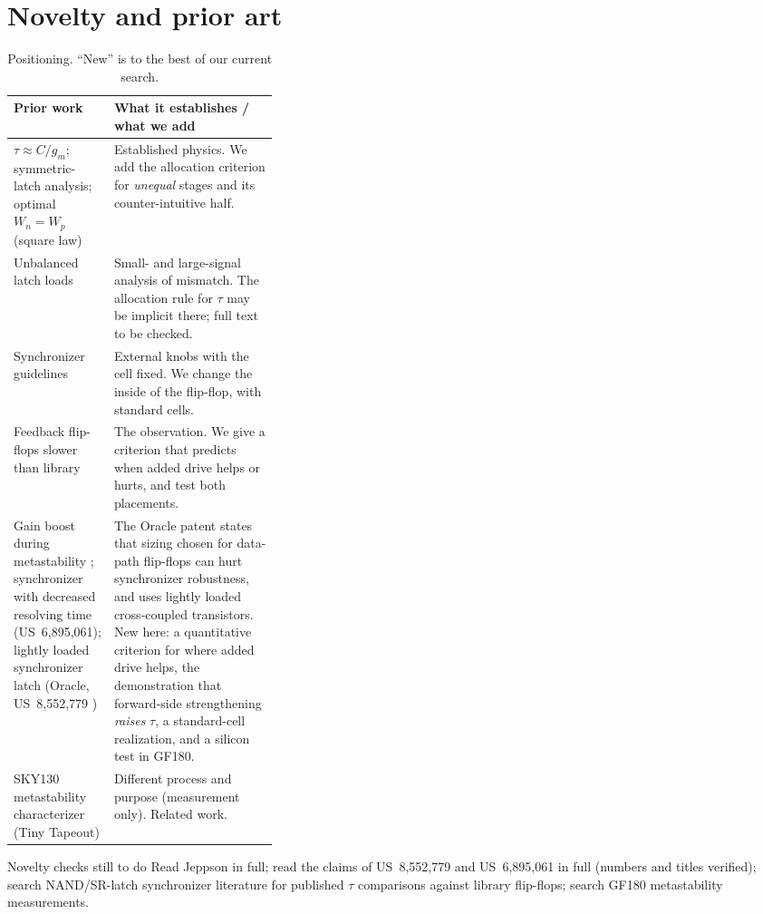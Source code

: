 \documentclass[11pt]{article}
\begin{document}
\section{Novelty and prior art}
\begin{table}[H]
\centering\small
\begin{tabularx}{\linewidth}{@{}p{0.34\linewidth}X@{}}
\toprule
Prior work & What it establishes / what we add \\
\midrule
$\tau\approx C/g_m$; symmetric-latch analysis; optimal $W_n=W_p$ (square law) \cite{portmann1995} & Established physics. We add the allocation criterion for \emph{unequal} stages and its counter-intuitive half. \\
Unbalanced latch loads \cite{jeppson1996} & Small- and large-signal analysis of mismatch. The allocation rule for $\tau$ may be implicit there; full text to be checked. \\
Synchronizer guidelines \cite{beer2015} & External knobs with the cell fixed. We change the inside of the flip-flop, with standard cells. \\
Feedback flip-flops slower than library \cite{beer2011} & The observation. We give a criterion that predicts when added drive helps or hurts, and test both placements. \\
Gain boost during metastability \cite{zhou2006}; synchronizer with decreased resolving time (US~6{,}895{,}061); lightly loaded synchronizer latch (Oracle, US~8{,}552{,}779 \cite{oracle2013}) & The Oracle patent states that sizing chosen for data-path flip-flops can hurt synchronizer robustness, and uses lightly loaded cross-coupled transistors. New here: a quantitative criterion for where added drive helps, the demonstration that forward-side strengthening \emph{raises} $\tau$, a standard-cell realization, and a silicon test in GF180. \\
SKY130 metastability characterizer (Tiny Tapeout) & Different process and purpose (measurement only). Related work. \\
\bottomrule
\end{tabularx}
\caption{Positioning. ``New'' is to the best of our current search.}
\end{table}
\begin{checkbox}{Novelty checks still to do}
Read Jeppson \cite{jeppson1996} in full; read the claims of US~8{,}552{,}779 and US~6{,}895{,}061 in full (numbers
and titles verified); search NAND/SR-latch synchronizer literature for published $\tau$ comparisons against library
flip-flops; search GF180 metastability measurements.
\end{checkbox}
\end{document}
